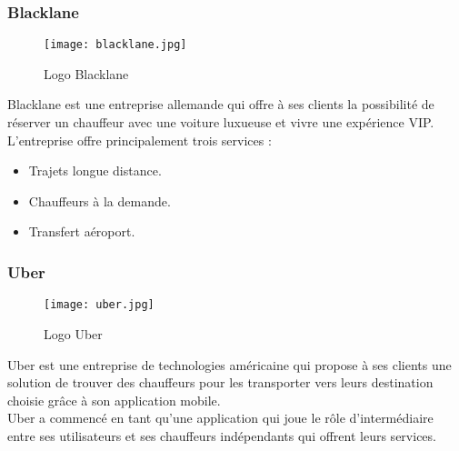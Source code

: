 \subsubsection{Blacklane}
\vspace{1cm}
\begin{figure}[H]
    \centering
    \texttt{[image: blacklane.jpg]}
    \vspace{0.5cm}
    \caption{Logo Blacklane}
    \label{fig:blacklane_logo}
\end{figure}
\vspace{1cm}
Blacklane \cite{blacklane} est une entreprise allemande qui offre à ses clients la possibilité de réserver un chauffeur avec une voiture luxueuse et vivre une expérience VIP.\\
\noindent L'entreprise offre principalement trois services :
\begin{itemize}
    \item Trajets longue distance.
    \item Chauffeurs à la demande.
    \item Transfert aéroport.
\end{itemize}
\subsubsection{Uber}
\vspace{1cm}
\begin{figure}[H]
    \centering
    \texttt{[image: uber.jpg]}
    \vspace{0.5cm}
    \caption{Logo Uber}
    \label{fig:uber_logo}
\end{figure}
\vspace{1cm}
Uber \cite{uber} est une entreprise de technologies américaine qui propose à ses clients une solution de trouver des chauffeurs pour les transporter vers leurs destination choisie grâce à son application mobile.\\
\noindent Uber a commencé en tant qu'une application qui joue le rôle d'intermédiaire entre ses utilisateurs et ses chauffeurs indépendants qui offrent leurs services.
